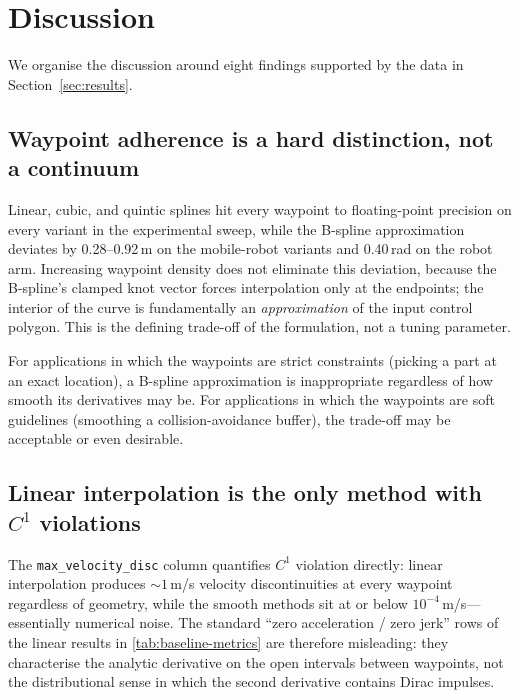 \section{Discussion}
\label{sec:discussion}

We organise the discussion around eight findings supported by the
data in Section~\ref{sec:results}.

\subsection{Waypoint adherence is a hard distinction, not a continuum}
\label{sec:disc-waypoint}

Linear, cubic, and quintic splines hit every waypoint to
floating-point precision on every variant in the experimental sweep,
while the B-spline approximation deviates by 0.28--0.92\,m on the
mobile-robot variants and 0.40\,rad on the robot arm. Increasing
waypoint density does not eliminate this deviation, because the
B-spline's clamped knot vector forces interpolation only at the
endpoints; the interior of the curve is fundamentally an
\emph{approximation} of the input control polygon. This is the
defining trade-off of the formulation, not a tuning parameter.

For applications in which the waypoints are strict constraints
(picking a part at an exact location), a B-spline approximation is
inappropriate regardless of how smooth its derivatives may be. For
applications in which the waypoints are soft guidelines (smoothing a
collision-avoidance buffer), the trade-off may be acceptable or even
desirable.

\subsection{Linear interpolation is the only method with $C^1$
violations}
\label{sec:disc-linear-c1}

The \texttt{max\_velocity\_disc} column quantifies $C^1$ violation
directly: linear interpolation produces $\sim 1$\,m/s velocity
discontinuities at every waypoint regardless of geometry, while the
smooth methods sit at or below $10^{-4}$\,m/s---essentially
numerical noise. The standard ``zero acceleration / zero jerk'' rows
of the linear results in \cref{tab:baseline-metrics} are therefore
misleading: they characterise the analytic derivative on the open
intervals between waypoints, not the distributional sense in which
the second derivative contains Dirac impulses.

